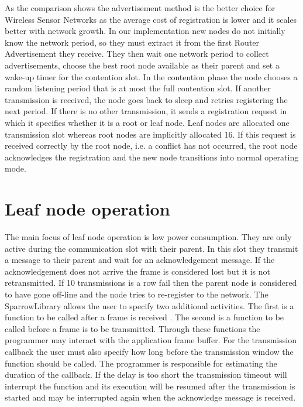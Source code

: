 As the comparison shows the advertisement method is the better choice for
Wireless Sensor Networks as the average cost of registration is lower and it
scales better with network growth. In our implementation new nodes do not
initially know the network period, so they must extract it from the first
Router Advertisement they receive. They then wait one network period to collect
advertisements, choose the best root node available as their parent and set a
wake-up timer for the contention slot. In the contention phase the node chooses
a random listening period that is at most the full contention slot. If another
transmission is received, the node goes back to sleep and retries registering
the next period. If there is no other transmission, it sends a registration
request in which it specifies whether it is a root or leaf node.  Leaf nodes
are allocated one transmission slot whereas root nodes are implicitly allocated
16. If this request is received correctly by the root node, i.e. a conflict has
not occurred, the root node acknowledges the registration and the new node
transitions into normal operating mode.

\section{Leaf node operation}
\label{sec:leaf_node_operation}

The main focus of leaf node operation is low power consumption. They are only
active during the communication slot with their parent. In this slot they
transmit a message to their parent and wait for an acknowledgement message. If
the acknowledgement does not arrive the frame is considered lost but it is not
retransmitted. If 10 transmissions is a row fail then the parent node is
considered to have gone off-line and the node tries to re-register to the
network. The SparrowLibrary allows the user to specify two additional
activities. The first is a function to be called after a frame is received .
The second is a function to be called before a frame is to be transmitted.
Through these functions the programmer may interact with the application frame
buffer. For the transmission callback the user must also specify how long
before the transmission window the function should be called. The programmer is
responsible for estimating the duration of the callback. If the delay is too
short the transmission timeout will interrupt the function and its execution
will be resumed after the transmission is started and may be interrupted again
when the acknowledge message is received.

